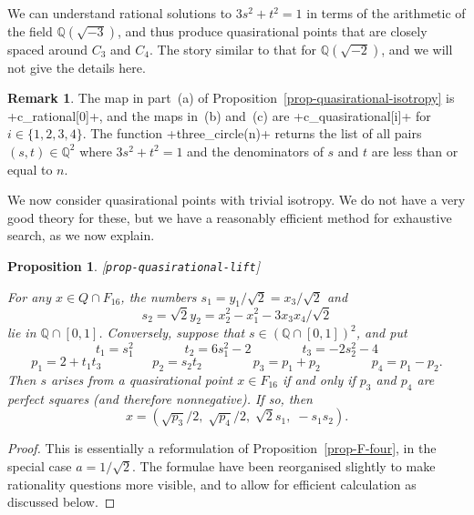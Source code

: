 \documentclass[reqno]{amsart}
\newcommand{\lbl}[1]{\label{#1}\textup{[\texttt{#1}]}\par}
\newcommand{\lbl}{\label}
\newcommand{\Q}         {{\mathbb{Q}}}
\newcommand{\rt}        {\sqrt{2}}
\renewcommand{\:}{\colon}
\newtheorem{proposition}[theorem]{Proposition}
\theoremstyle{definition}
\newtheorem{remark}[theorem]{Remark}
\begin{document}
We can understand rational solutions to $3s^2+t^2=1$ in terms of the
arithmetic of the field $\Q(\sqrt{-3})$, and thus produce
quasirational points that are closely spaced around $C_3$ and $C_4$.
The story similar to that for $\Q(\sqrt{-2})$, and we will not give
the details here.

\begin{remark}
 The map in part~(a) of Proposition~\ref{prop-quasirational-isotropy}
 is \mcode+c_rational[0]+, and the maps in~(b) and~(c) are
 \mcode+c_quasirational[i]+ for $i\in\{1,2,3,4\}$.  The function
 \mcode+three_circle(n)+ returns the list of all pairs $(s,t)\in\Q^2$
 where $3s^2+t^2=1$ and the denominators of $s$ and $t$ are less than
 or equal to $n$.
\end{remark}

We now consider quasirational points with trivial isotropy.  We do not
have a very good theory for these, but we have a reasonably efficient
method for exhaustive search, as we now explain.

\begin{proposition}\lbl{prop-quasirational-lift}
 For any $x\in Q\cap F_{16}$, the numbers $s_1=y_1/\rt=x_3/\rt$ and
 \[ s_2 = \rt y_2 = x_2^2-x_1^2-3x_3x_4/\rt \]
 lie in $\Q\cap [0,1]$.  Conversely, suppose that
 $s\in(\Q\cap [0,1])^2$, and put
 \[ t_1 = s_1^2 \hspace{4em}
    t_2 = 6s_1^2 - 2 \hspace{4em}
    t_3 = -2s_2^2-4
 \]
 \[ p_1 = 2+t_1t_3 \hspace{4em}
    p_2 = s_2t_2 \hspace{4em}
    p_3 = p_1+p_2 \hspace{4em}
    p_4 = p_1-p_2.
 \]
 Then $s$ arises from a quasirational point $x\in F_{16}$ if and only
 if $p_3$ and $p_4$ are perfect squares (and therefore nonnegative).
 If so, then
 \[ x = (\sqrt{p_3}/2,\;\sqrt{p_4}/2,\;\rt s_1,\;-s_1s_2). \]
\end{proposition}
\begin{proof}
 This is essentially a reformulation of Proposition~\ref{prop-F-four},
 in the special case $a=1/\rt$.  The formulae have been reorganised
 slightly to make rationality questions more visible, and to allow for
 efficient calculation as discussed below.
\end{proof}
\end{document}
